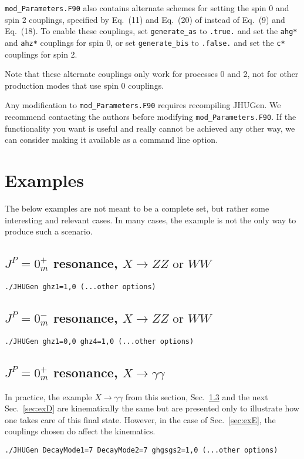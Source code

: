 \documentclass[aps,superscriptaddress,nofootinbib]{revtex4}
\begin{document}
\verb|mod_Parameters.F90| also contains alternate schemes for setting the spin 0 and spin 2 couplings, specified by Eq.~(11) and Eq.~(20) of \cite{Bolognesi:2012} instead of Eq.~(9) and Eq.~(18).  To enable these couplings, set \verb|generate_as| to \verb|.true.| and set the \verb|ahg*| and \verb|ahz*| couplings for spin 0, or set \verb|generate_bis| to \verb|.false.| and set the \verb|c*| couplings for spin 2.

Note that these alternate couplings only work for processes 0 and 2, not for other production modes that use spin 0 couplings.

Any modification to \verb|mod_Parameters.F90| requires recompiling JHUGen.  We recommend contacting the authors before modifying \verb|mod_Parameters.F90|.  If the functionality you want is useful and really cannot be achieved any other way, we can consider making it available as a command line option.

\section{Examples}
\noindent
The below examples are not meant to be a complete set, but rather some interesting and relevant cases.
In many cases, the example is not the only way to produce such a scenario.

\subsection{\texorpdfstring{$J^P = 0^+_m$ resonance, $X \to ZZ\text{ or }WW$}{JP=0+m resonance, X -> ZZ or WW}}
\label{sec:exA}
\begin{verbatim}
./JHUGen ghz1=1,0 (...other options)
\end{verbatim}
\subsection{\texorpdfstring{$J^P = 0^-_m$ resonance, $X \to ZZ\text{ or }WW$}{JP=0-m resonance, X -> ZZ or WW}}
\label{sec:exB}
\begin{verbatim}
./JHUGen ghz1=0,0 ghz4=1,0 (...other options)
\end{verbatim}
\subsection{\texorpdfstring{$J^P = 0^+_m$ resonance, $X \to \gamma \gamma$}{JP=0+m resonance, X -> gamma gamma}}
\label{sec:exC}
In practice, the example $X \to \gamma \gamma$ from this section, Sec.~\ref{sec:exC} and the next Sec.~\ref{sec:exD} are
kinematically the same but are presented only to illustrate how one takes care of this final state.  However, in the case of Sec.~\ref{sec:exE}, the couplings chosen do affect the kinematics.
\begin{verbatim}
./JHUGen DecayMode1=7 DecayMode2=7 ghgsgs2=1,0 (...other options)
\end{verbatim}
\end{document}
